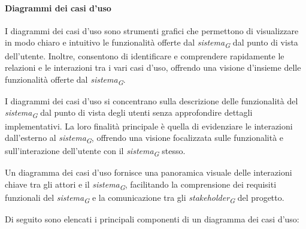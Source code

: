 \paragraph{Diagrammi dei casi d'uso} 
I diagrammi dei casi d'uso sono strumenti grafici che permettono di visualizzare in modo chiaro e intuitivo le funzionalità offerte dal \textit{sistema}\textsubscript{\textit{G}} dal punto di vista dell'utente. Inoltre, consentono di identificare e comprendere rapidamente le relazioni e le interazioni tra i vari casi d'uso, offrendo una visione d'insieme delle funzionalità offerte dal \textit{sistema}\textsubscript{\textit{G}}.

\vspace{0.2cm}

I diagrammi dei casi d'uso si concentrano sulla descrizione delle funzionalità del \textit{sistema}\textsubscript{\textit{G}} dal punto di vista degli utenti senza approfondire dettagli implementativi. La loro finalità principale è quella di evidenziare le interazioni dall'esterno al \textit{sistema}\textsubscript{\textit{G}}, offrendo una visione focalizzata sulle funzionalità e sull'interazione dell'utente con il \textit{sistema}\textsubscript{\textit{G}} stesso. 

\vspace{0.2cm}

Un diagramma dei casi d'uso fornisce una panoramica visuale delle interazioni chiave tra gli attori e il \textit{sistema}\textsubscript{\textit{G}}, facilitando la comprensione dei requisiti funzionali del \textit{sistema}\textsubscript{\textit{G}} e la comunicazione tra gli \textit{stakeholder}\textsubscript{\textit{G}} del progetto.

Di seguito sono elencati i principali componenti di un diagramma dei casi d'uso:
\pagebreak

